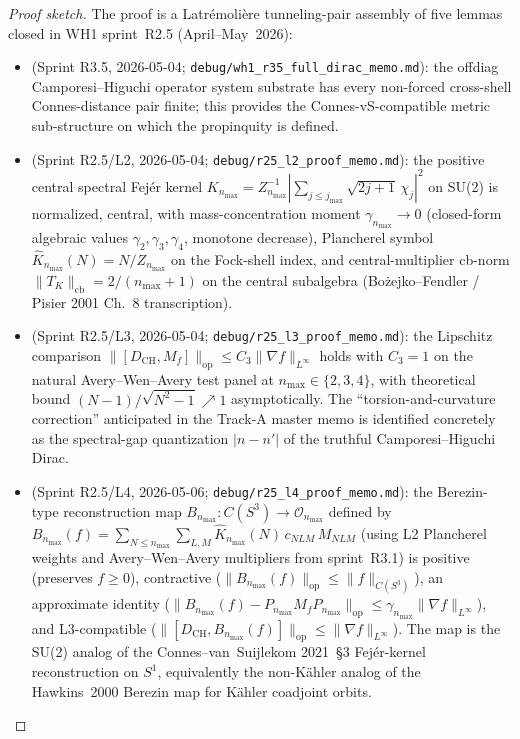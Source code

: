 \documentclass[11pt]{article}
\begin{document}
\begin{proof}[Proof sketch]
The proof is a Latr{\'e}moli{\`e}re tunneling-pair assembly of five
lemmas closed in WH1 sprint~R2.5 (April--May~2026):

\begin{itemize}
\item[\textbf{L1${}'$}] (Sprint R3.5, 2026-05-04;
\texttt{debug/wh1\_r35\_full\_dirac\_memo.md}): the offdiag
Camporesi--Higuchi operator system substrate has every non-forced
cross-shell Connes-distance pair finite; this provides the
Connes-vS-compatible metric sub-structure on which the propinquity is
defined.

\item[\textbf{L2}] (Sprint R2.5/L2, 2026-05-04;
\texttt{debug/r25\_l2\_proof\_memo.md}): the positive central spectral
Fej{\'e}r kernel $K_{n_{\max}} = Z_{n_{\max}}^{-1} |\sum_{j \le j_{\max}}
\sqrt{2j+1}\,\chi_j|^2$ on SU(2) is normalized, central, with
mass-concentration moment $\gamma_{n_{\max}} \to 0$ (closed-form
algebraic values $\gamma_2, \gamma_3, \gamma_4$, monotone decrease),
Plancherel symbol $\hat{K}_{n_{\max}}(N) = N/Z_{n_{\max}}$ on the
Fock-shell index, and central-multiplier cb-norm
$\|T_K\|_{\mathrm{cb}} = 2/(n_{\max}+1)$ on the central subalgebra
(Bo{\.z}ejko--Fendler / Pisier 2001 Ch.~8 transcription).

\item[\textbf{L3}] (Sprint R2.5/L3, 2026-05-04;
\texttt{debug/r25\_l3\_proof\_memo.md}): the Lipschitz comparison
$\|[D_{\mathrm{CH}}, M_f]\|_{\mathrm{op}} \le C_3 \|\nabla
f\|_{L^\infty}$ holds with $C_3 = 1$ on the natural Avery--Wen--Avery
test panel at $n_{\max} \in \{2, 3, 4\}$, with theoretical bound
$(N-1)/\sqrt{N^2-1} \nearrow 1$ asymptotically.  The
``torsion-and-curvature correction'' anticipated in the Track-A
master memo is identified concretely as the spectral-gap quantization
$|n - n'|$ of the truthful Camporesi--Higuchi Dirac.

\item[\textbf{L4}] (Sprint R2.5/L4, 2026-05-06;
\texttt{debug/r25\_l4\_proof\_memo.md}): the Berezin-type reconstruction
map $B_{n_{\max}}: C(S^3) \to \mathcal{O}_{n_{\max}}$ defined by
$B_{n_{\max}}(f) = \sum_{N \le n_{\max}}\sum_{L,M} \hat{K}_{n_{\max}}(N)\,
c_{NLM}\, M_{NLM}$ (using L2 Plancherel weights and Avery--Wen--Avery
multipliers from sprint~R3.1) is positive (preserves $f \ge 0$),
contractive ($\|B_{n_{\max}}(f)\|_{\mathrm{op}} \le \|f\|_{C(S^3)}$),
an approximate identity ($\|B_{n_{\max}}(f) - P_{n_{\max}} M_f
P_{n_{\max}}\|_{\mathrm{op}} \le \gamma_{n_{\max}} \|\nabla
f\|_{L^\infty}$), and L3-compatible
($\|[D_{\mathrm{CH}}, B_{n_{\max}}(f)]\|_{\mathrm{op}} \le \|\nabla
f\|_{L^\infty}$).  The map is the SU(2) analog of the
Connes--van~Suijlekom 2021~\S3 Fej{\'e}r-kernel reconstruction on
$S^1$, equivalently the non-K{\"a}hler analog of the Hawkins~2000
Berezin map for K{\"a}hler coadjoint orbits.


\end{itemize}
\end{proof}
\end{document}
